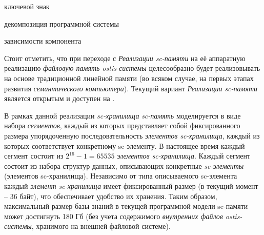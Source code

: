 \begin{SCn}
\begin{scnindent}
	\begin{scnreltolist}{ключевой знак}
	\end{scnreltolist}
\end{scnindent}
\begin{scnrelfromset}{декомпозиция программной системы}
\end{scnrelfromset}
\begin{scnrelfromset}{зависимости компонента}
\end{scnrelfromset}
\end{SCn}

Стоит отметить, что при переходе с \textit{Реализации sc-памяти} на её аппаратную реализацию  \textit{файловую память ostis-системы} целесообразно будет реализовывать на основе традиционной линейной памяти (во всяком случае, на первых этапах развития \textit{семантического компьютера}). Текущий вариант \textit{Реализации sc-памяти} является открытым и доступен на .

В рамках данной реализации \textit{sc-хранилища} \textit{sc-память} моделируется в виде набора \textit{сегментов}, каждый из которых представляет собой фиксированного размера упорядоченную последовательность \textit{элементов sc-хранилища}, каждый из которых соответствует конкретному sc-элементу. В настоящее время каждый сегмент состоит из $2^{16}-1=65535$ \textit{элементов sc-хранилища}. Каждый сегмент состоит из набора структур данных, описывающих конкретные \textit{sc-элементы} (элементов sc-хранилища). Независимо от типа описываемого sc-элемента каждый \textit{элемент sc-хранилища} имеет фиксированный размер (в текущий момент -- 36 байт), что обеспечивает удобство их хранения. Таким образом, максимальный размер базы знаний в текущей программной модели sc-памяти может достигнуть 180 Гб (без учета содержимого \textit{внутренних файлов ostis-системы}, хранимого на внешней файловой системе).

